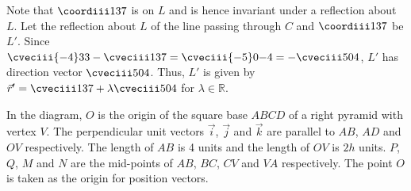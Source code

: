 \documentclass{jhwhw}
\begin{document}

            Note that $\coordiii137$ is on $L$ and is hence invariant under a reflection about $L$. Let the reflection about $L$ of the line passing through $C$ and $\coordiii137$ be $L'$. Since $\cveciii{-4}33 - \cveciii137 = \cveciii{-5}0{-4} = -\cveciii504$, $L'$ has direction vector $\cveciii504$. Thus, $L'$ is given by $\vec r' = \cveciii137 + \lambda \cveciii504$ for $\lambda \in \mathbb{R}$.


    \problem{}
        \begin{center}
        \end{center}
        In the diagram, $O$ is the origin of the square base $ABCD$ of a right pyramid with vertex $V$. The perpendicular unit vectors $\vec i$, $\vec j$ and $\vec k$ are parallel to $AB$, $AD$ and $OV$ respectively. The length of $AB$ is 4 units and the length of $OV$ is $2h$ units. $P$, $Q$, $M$ and $N$ are the mid-points of $AB$, $BC$, $CV$ and $VA$ respectively. The point $O$ is taken as the origin for position vectors.
\end{document}
